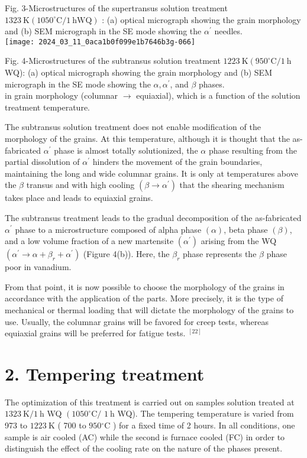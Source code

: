 \documentclass[10pt]{article}
\begin{document}
Fig. 3-Microstructures of the supertransus solution treatment $1323 \mathrm{~K}\left(1050^{\circ} \mathrm{C} / 1 \mathrm{~h} \mathrm{WQ}\right)$ : (a) optical micrograph showing the grain morphology and (b) SEM micrograph in the SE mode showing the $\alpha^{\prime}$ needles.\\
\texttt{[image: 2024\_03\_11\_0aca1b0f099e1b7646b3g-066]}

Fig. 4-Microstructures of the subtransus solution treatment $1223 \mathrm{~K}\left(950^{\circ} \mathrm{C} / 1 \mathrm{~h}\right.$ WQ): (a) optical micrograph showing the grain morphology and (b) SEM micrograph in the SE mode showing the $\alpha, \alpha^{\prime}$, and $\beta$ phases.\\
in grain morphology (columnar $\rightarrow$ equiaxial), which is a function of the solution treatment temperature.

The subtransus solution treatment does not enable modification of the morphology of the grains. At this temperature, although it is thought that the as-fabricated $\alpha^{\prime}$ phase is almost totally solutionized, the $\alpha$ phase resulting from the partial dissolution of $\alpha^{\prime}$ hinders the movement of the grain boundaries, maintaining the long and wide columnar grains. It is only at temperatures above the $\beta$ transus and with high cooling $\left(\beta \rightarrow \alpha^{\prime}\right)$ that the shearing mechanism takes place and leads to equiaxial grains.

The subtransus treatment leads to the gradual decomposition of the as-fabricated $\alpha^{\prime}$ phase to a microstructure composed of alpha phase $(\alpha)$, beta phase $(\beta)$, and a low volume fraction of a new martensite $\left(\alpha^{\prime}\right)$ arising from the WQ $\left(\alpha^{\prime} \rightarrow \alpha+\beta_{r}+\alpha^{\prime}\right)$ (Figure 4(b)). Here, the $\beta_{r}$ phase represents the $\beta$ phase poor in vanadium.

From that point, it is now possible to choose the morphology of the grains in accordance with the application of the parts. More precisely, it is the type of mechanical or thermal loading that will dictate the morphology of the grains to use. Usually, the columnar grains will be favored for creep tests, whereas equiaxial grains will be preferred for fatigue tests. ${ }^{[22]}$

\section*{2. Tempering treatment}
The optimization of this treatment is carried out on samples solution treated at $1323 \mathrm{~K} / 1 \mathrm{~h}$ WQ $\left(1050^{\circ} \mathrm{C} /\right.$ $1 \mathrm{~h}$ WQ). The tempering temperature is varied from 973 to $1223 \mathrm{~K}$ ( 700 to $950{ }^{\circ} \mathrm{C}$ ) for a fixed time of 2 hours. In all conditions, one sample is air cooled (AC) while the second is furnace cooled (FC) in order to distinguish the effect of the cooling rate on the nature of the phases present.
\end{document}
